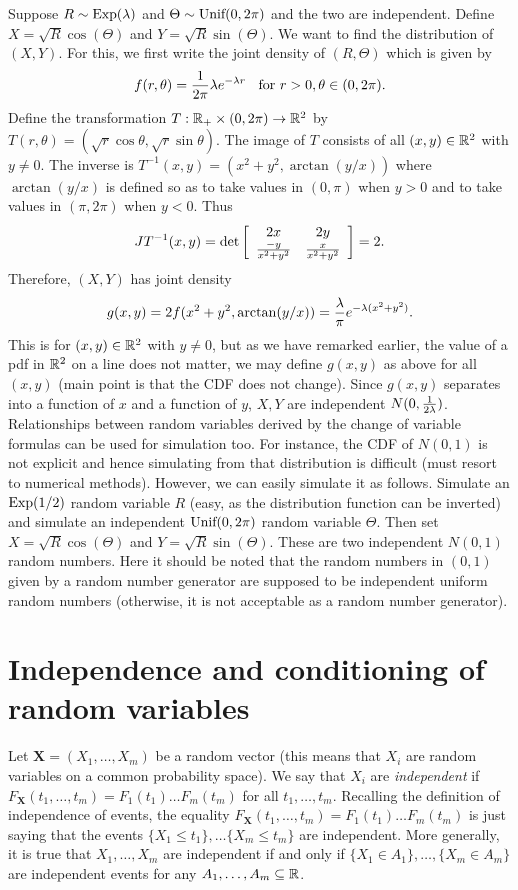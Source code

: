 \documentclass[preprint,  11pt]{amsart}
\def\X{\mathbf{X}}
\begin{document}
\beg Suppose $R\sim \mb{Exp}(\lam)$ and $\Theta\sim \mb{Unif}(0,2\pi)$ and the two are independent. Define $X=\sqrt{R}\cos(\Theta)$ and $Y=\sqrt{R}\sin(\Theta)$. We want to find the distribution of $(X,Y)$. For this, we first write the joint density of $(R,\Theta)$ which is given by
$$
f(r,\theta)=\frac{1}{2\pi}\lam e^{-\lam r} \hsp{2mm}\mb{ for }r>0,\theta\in (0,2\pi).
$$
Define the transformation $T:\R_{+}\times (0,2\pi)\to \R^{2}$ by $T(r,\theta)=(\sqrt{r}\cos\theta,\sqrt{r}\sin \theta)$. The image of $T$ consists of all $(x,y)\in \R^{2}$ with $y\not=0$. The inverse is $T^{-1}(x,y)=(x^{2}+y^{2},\arctan(y/x))$ where $\arctan(y/x)$ is defined so as to take values in $(0,\pi)$ when $y>0$ and to take values in $(\pi,2\pi)$ when $y<0$. Thus
$$
JT^{-1}(x,y) = \det\l[\begin{array}{cc} 2x & 2y \\ \frac{-y}{x^{2}+y^{2}} & \frac{x}{x^{2}+y^{2}} \end{array} \r]
=2.
$$
Therefore, $(X,Y)$ has joint density
$$
g(x,y) = 2f(x^{2}+y^{2},\arctan(y/x)) = \frac{\lam}{\pi} e^{-\lam(x^{2}+y^{2})}.
$$
This is for $(x,y)\in \R^{2}$ with $y\not=0$, but as we have remarked earlier, the value of a pdf in $\R^{2}$ on a line does not matter, we may define $g(x,y)$ as above for all $(x,y)$ (main point is that the CDF does not change). Since $g(x,y)$ separates into a function of $x$ and a function of $y$, $X,Y$ are independent $N(0,\frac{1}{2\lam})$.
\eeg
\berk Relationships between random variables derived by the change of variable formulas can be used for simulation too. For instance, the CDF of $N(0,1)$ is not explicit and hence simulating from that distribution is difficult (must resort to numerical methods). However, we can easily simulate it as follows. Simulate an $\mb{Exp}(1/2)$ random variable $R$ (easy, as the distribution function can be inverted) and simulate an independent $\mb{Unif}(0,2\pi)$ random variable $\Theta$. Then set $X=\sqrt{R}\cos(\Theta)$ and $Y=\sqrt{R}\sin(\Theta)$. These are two independent $N(0,1)$ random numbers. Here it should be noted that the random numbers in $(0,1)$ given by a random number generator are supposed to be independent uniform random numbers (otherwise, it is not acceptable as a random number generator).
\eerk


\section{Independence and conditioning of random variables}
\bdefn Let $\X=(X_{1},\ldots ,X_{m})$ be a random vector (this means that $X_{i}$ are random variables on a common probability space). We say that $X_{i}$ are {\em independent} if $F_{\X}(t_{1},\ldots ,t_{m})=F_{1}(t_{1})\ldots F_{m}(t_{m})$ for all $t_{1},\ldots ,t_{m}$.
\edefn
\berk Recalling the definition of independence of events, the equality $F_{\X}(t_{1},\ldots ,t_{m})=F_{1}(t_{1})\ldots F_{m}(t_{m})$ is just saying that the events $\{X_{1}\le t_{1}\}, \ldots \{X_{m}\le t_{m}\}$ are independent. More generally, it is true that $X_{1},\ldots ,X_{m}$ are independent if and only if $\{X_{1}\in A_{1}\},\ldots ,\{X_{m}\in A_{m}\}$ are independent events for any $A_{1},\ldots, A_{m}\subseteq \R$.
\eerk
\end{document}
